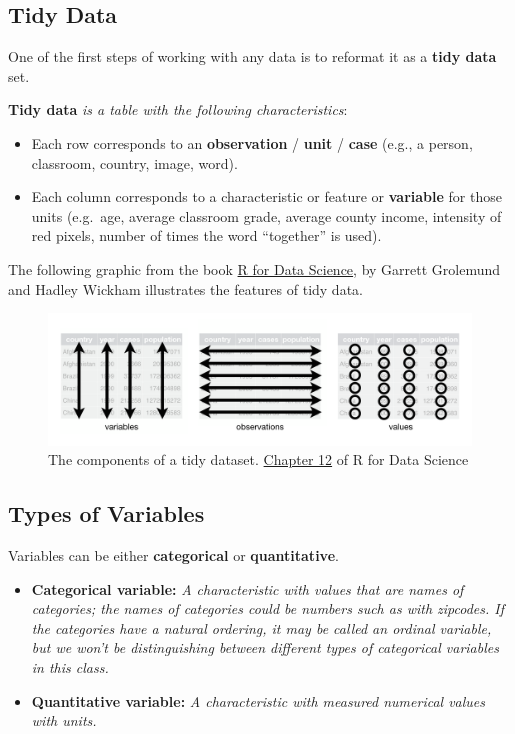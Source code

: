 \documentclass[
]{book}
\providecommand{\tightlist}{%
  \setlength{\itemsep}{0pt}\setlength{\parskip}{0pt}}
\begin{document}
\subsection{Tidy Data}\label{tidy-data}

One of the first steps of working with any data is to reformat it as a \textbf{tidy data} set.

\textbf{Tidy data} \emph{is a table with the following characteristics}:

\begin{itemize}
\tightlist
\item
  Each row corresponds to an \textbf{observation} / \textbf{unit} / \textbf{case} (e.g., a person, classroom, country, image, word).
\item
  Each column corresponds to a characteristic or feature or \textbf{variable} for those units (e.g.~age, average classroom grade, average county income, intensity of red pixels, number of times the word ``together'' is used).
\end{itemize}

The following graphic from the book \href{http://r4ds.had.co.nz/}{R for Data Science}, by Garrett Grolemund and Hadley Wickham illustrates the features of tidy data.

\begin{figure}
\centering
\includegraphics{Photos/tidy.png}
\caption{The components of a tidy dataset. \href{http://r4ds.had.co.nz/tidy-data.html}{Chapter 12} of R for Data Science}
\end{figure}

\subsection{Types of Variables}\label{types-of-variables}

Variables can be either \textbf{categorical} or \textbf{quantitative}.

\begin{itemize}
\item
  \textbf{Categorical variable:} \emph{A characteristic with values that are names of categories; the names of categories could be numbers such as with zipcodes. If the categories have a natural ordering, it may be called an ordinal variable, but we won't be distinguishing between different types of categorical variables in this class.}
\item
  \textbf{Quantitative variable:} \emph{A characteristic with measured numerical values with units.}
\end{itemize}
\end{document}
